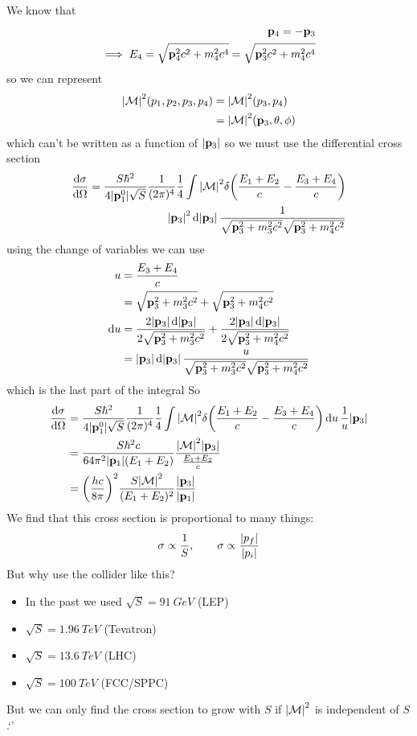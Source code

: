 \documentclass[../main.tex]{subfiles}
\begin{document}
We know that
\begin{align*}
    \vb p_4 = -\vb p_3 \\
    \implies E_4 = \sqrt{\vb p_4^2 c^2 + m_4^2 c^4} = \sqrt{\vb p_3^2 c^2 + m_4^2 c^4}
\end{align*}
so we can represent
\begin{align*}
    \abs{\mathcal{M}}^2 (p_1, p_2, p_3, p_4) &= \abs{\mathcal{M}}^2 (p_3, p_4) \\
    &= \abs{\mathcal{M}}^2 (\vb p_3, \theta, \phi)
\end{align*}
which can't be written as a function of $\abs{\vb p_3}$ so we must use the differential cross section
\begin{align*}
    \dv{\sigma}{\Omega} = \frac{S\hbar^2}{4\abs{\vb p_1^0} \sqrt{S}} \frac{1}{(2\pi)^4} \frac{1}{4}
    \int \abs{\mathcal{M}}^2 \delta \qt(\frac{E_1 + E_2}{c} - \frac{E_3 + E_4}{c}) \\
    \abs{\vb p_3}^2
    \dd{\abs{\vb p_3}} \frac{1}{\sqrt{\vb p_3^2 + m_3^2 c^2} \sqrt{\vb p_3^2 + m_4^2 c^2}}
\end{align*}
using the change of variables we can use
\begin{align*}
    u &= \frac{E_3 + E_4}{c} \\
    &= \sqrt{\vb p_3^2 + m_3^2 c^2} + \sqrt{\vb p_3^2 + m_4^2 c^2} \\
    \dd{u} &= \frac{2\abs{\vb p_3} \dd{\abs{\vb p_3}}}{2\sqrt{\vb p_3^2 + m_3^2 c^2}} 
    + \frac{2\abs{\vb p_3} \dd{\abs{\vb p_3}}}{2\sqrt{\vb p_3^2 + m_4^2 c^2}} \\
    &= \abs{\vb p_3} \dd{\abs{\vb p_3}} \frac{u}{\sqrt{\vb p_3^2 + m_3^2 c^2} \sqrt{\vb p_3^2 + m_4^2 c^2}}
\end{align*}
which is the last part of the integral So
\begin{align*}
    \dv{\sigma}{\Omega} &= \frac{S\hbar^2}{4\abs{\vb p_1^0} \sqrt{S}} \frac{1}{(2\pi)^4} \frac{1}{4}
    \int \abs{\mathcal{M}}^2 \delta \qt(\frac{E_1 + E_2}{c} - \frac{E_3 + E_4}{c}) \dd{u} \frac{1}{u} \abs{\vb p_3} \\
    &= \frac{S\hbar^2 c}{64 \pi^2 \abs{\vb p_1} (E_1 + E_2)} \frac{\abs{\mathcal{M}}^2 \abs{\vb p_3}}{\frac{E_1 + E_2}{c}} \\
    &= \qt(\frac{hc}{8\pi})^2 \frac{S \abs{\mathcal{M}}^2}{(E_1 + E_2)^2} \frac{\abs{\vb p_3}}{\abs{\vb p_1}}
\end{align*}
We find that this cross section is proportional to many things:
\begin{align*}
    \sigma \propto \frac{1}{S}, \qquad
    \sigma \propto \frac{\abs{p_f}}{{\abs{p_i}}}
\end{align*}
But why use the collider like this? 
\begin{itemize}
    \item In the past we used $\sqrt{S} = \qty{91}{GeV}$ (LEP)
    \item $\sqrt{S} = \qty{1.96}{TeV}$ (Tevatron) 
    \item $\sqrt{S} = \qty{13.6}{TeV}$ (LHC)
    \item $\sqrt{S} = \qty{100}{TeV}$ (FCC/SPPC)
\end{itemize}
But we can only find the cross section to grow with $S$ if $\abs{\mathcal{M}}^2$ is independent of $S$.`'
\end{document}
